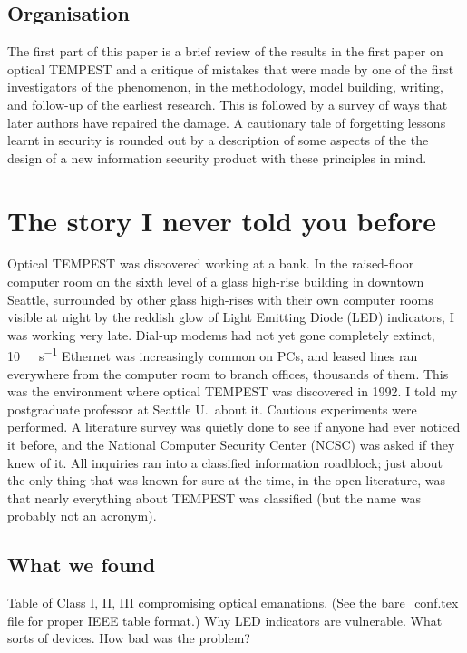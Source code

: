 \documentclass[conference]{IEEEtran}
\begin{document}
\subsection{Organisation}

The first part of this paper is a brief review of the results in the first
paper on optical TEMPEST and a critique of mistakes that were made by one
of the first investigators of the phenomenon, in the methodology, model
building, writing, and follow-up of the earliest research. This is followed
by a survey of ways that later authors have repaired the damage. A cautionary
tale of forgetting lessons learnt in security is rounded out by a description
of some aspects of the the design of a new information security product with
these principles in mind.

\section{The story I never told you before}

Optical TEMPEST was discovered working at a bank. In the raised-floor
computer room on the sixth level of a glass high-rise building in downtown
Seattle, surrounded by other glass high-rises with their own computer rooms
visible at night by the reddish glow of Light Emitting Diode (LED)
indicators, I was working very late. Dial-up modems had not yet gone
completely extinct, \SI{10}{\mega\bit\per\second} Ethernet was increasingly
common on PCs, and leased lines ran everywhere from the computer room to
branch offices, thousands of them. This was the environment where optical
TEMPEST was discovered in 1992. I told my postgraduate professor at Seattle
U.\ about it. Cautious experiments were performed. A literature survey was
quietly done to see if anyone had ever noticed it before, and the National
Computer Security Center (NCSC) was asked if they knew of it. All inquiries
ran into a classified information roadblock; just about the only thing that
was known for sure at the time, in the open literature, was that nearly
everything about TEMPEST was classified (but the name was probably not an
acronym).

\subsection{What we found}

Table of Class I, II, III compromising optical emanations. (See the
bare\_conf.tex file for proper IEEE table format.) Why LED indicators are
vulnerable. What sorts of devices. How bad was the problem?
\end{document}
